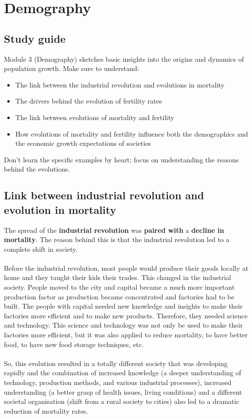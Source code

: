\documentclass[../summary.tex]{subfiles}
\begin{document}
\section{Demography}

\subsection{Study guide}

Module 3 (Demography) sketches basic insights into the origins and dynamics of population growth. Make sure to understand:
\begin{itemize}
	\setlength{\itemsep}{0pt}
	\item The link between the industrial revolution and evolutions in mortality
	\item The drivers behind the evolution of fertility rates
	\item The link between evolutions of mortality and fertility
	\item How evolutions of mortality and fertility influence both the demographics and the economic
	      growth expectations of societies
\end{itemize}
Don't learn the specific examples by heart; focus on understanding the reasons behind the evolutions.

\subsection{Link between industrial revolution and evolution in mortality}
The spread of the \textbf{industrial revolution} was \textbf{paired with} a \textbf{decline in mortality}. The reason behind this is that the industrial revolution led to a complete shift in society.
\\\\
Before the industrial revolution, most people would produce their goods locally at home and they taught their kids their trades. This changed in the industrial society. People moved to the city and capital became a much more important production factor as production became concentrated and factories had to be built. The people with capital needed new knowledge and insights to make their factories more efficient and to make new products. Therefore, they needed science and technology. This science and technology was not only be used to make their factories more efficient, but it was also applied to reduce mortality, to have better food, to have new food storage techniques, etc.
\\\\
So, this evolution resulted in a totally different society that was developing rapidly and the combination of increased knowledge (a deeper understanding of technology, production methods, and various industrial processes), increased understanding (a better grasp of health issues, living conditions) and a different societal organisation (shift from a rural society to cities) also led to a dramatic reduction of mortality rates.
\end{document}
